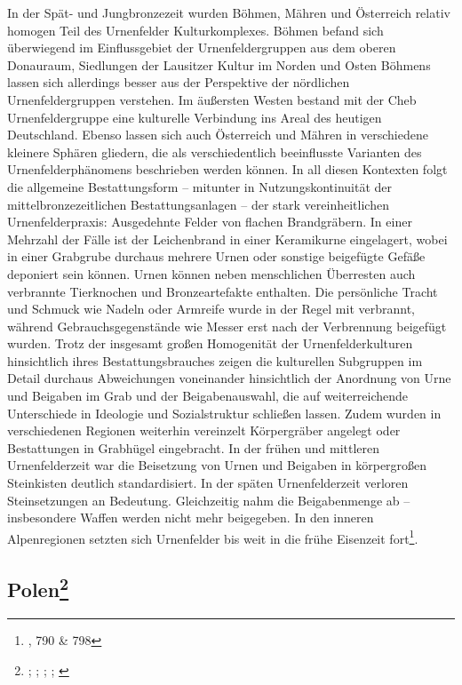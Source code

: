 \documentclass[openany,twoside,twocolumn]{book}
\let\rmarkdownfootnote\footnote%
\def\footnote{\protect\rmarkdownfootnote}
\begin{document}
In der Spät- und Jungbronzezeit wurden Böhmen, Mähren und Österreich
relativ homogen Teil des Urnenfelder Kulturkomplexes. Böhmen befand sich
überwiegend im Einflussgebiet der Urnenfeldergruppen aus dem oberen
Donauraum, Siedlungen der Lausitzer Kultur im Norden und Osten Böhmens
lassen sich allerdings besser aus der Perspektive der nördlichen
Urnenfeldergruppen verstehen. Im äußersten Westen bestand mit der Cheb
Urnenfeldergruppe eine kulturelle Verbindung ins Areal des heutigen
Deutschland. Ebenso lassen sich auch Österreich und Mähren in
verschiedene kleinere Sphären gliedern, die als verschiedentlich
beeinflusste Varianten des Urnenfelderphänomens beschrieben werden
können. In all diesen Kontexten folgt die allgemeine Bestattungsform --
mitunter in Nutzungskontinuität der mittelbronzezeitlichen
Bestattungsanlagen -- der stark vereinheitlichen Urnenfelderpraxis:
Ausgedehnte Felder von flachen Brandgräbern. In einer Mehrzahl der Fälle
ist der Leichenbrand in einer Keramikurne eingelagert, wobei in einer
Grabgrube durchaus mehrere Urnen oder sonstige beigefügte Gefäße
deponiert sein können. Urnen können neben menschlichen Überresten auch
verbrannte Tierknochen und Bronzeartefakte enthalten. Die persönliche
Tracht und Schmuck wie Nadeln oder Armreife wurde in der Regel mit
verbrannt, während Gebrauchsgegenstände wie Messer erst nach der
Verbrennung beigefügt wurden. Trotz der insgesamt großen Homogenität der
Urnenfelderkulturen hinsichtlich ihres Bestattungsbrauches zeigen die
kulturellen Subgruppen im Detail durchaus Abweichungen voneinander
hinsichtlich der Anordnung von Urne und Beigaben im Grab und der
Beigabenauswahl, die auf weiterreichende Unterschiede in Ideologie und
Sozialstruktur schließen lassen. Zudem wurden in verschiedenen Regionen
weiterhin vereinzelt Körpergräber angelegt oder Bestattungen in
Grabhügel eingebracht. In der frühen und mittleren Urnenfelderzeit war
die Beisetzung von Urnen und Beigaben in körpergroßen Steinkisten
deutlich standardisiert. In der späten Urnenfelderzeit verloren
Steinsetzungen an Bedeutung. Gleichzeitig nahm die Beigabenmenge ab --
insbesondere Waffen werden nicht mehr beigegeben. In den inneren
Alpenregionen setzten sich Urnenfelder bis weit in die frühe Eisenzeit
fort\footnote{\textcite{lubos_czech_2013}, 790 \& 798}.

\hypertarget{polen}{%
\subsection[Polen]{\texorpdfstring{Polen\footnote{\textcite{dabrowski_aeltere_2004};
  \textcite{czebreszuk_bronze_2013};
  \textcite{czebreszuk_northeast_2003};
  \textcite{machnik_fruhbronzezeit_1977};
  \textcite{muller_bruszczewo_2004}}}{Polen}}\label{polen}}
\end{document}
